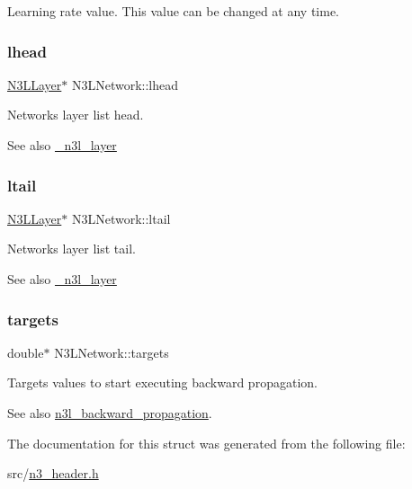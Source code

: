 Learning rate value. This value can be changed at any time. \mbox{\label{structN3LNetwork_ae77d4b7deecdc3c9590a4112689db2f8}} 
\subsubsection{\texorpdfstring{lhead}{lhead}}
{\footnotesize\ttfamily \hyperlink{n3__header_8h_a9ee3a7104816bdb6222148cfe9ca8ad9}{N3\+L\+Layer}$\ast$ N3\+L\+Network\+::lhead}

Network\textquotesingle{}s layer list head. \begin{DoxySeeAlso}{See also}
\hyperlink{struct__n3l__layer}{\+\_\+n3l\+\_\+layer} 
\end{DoxySeeAlso}
\mbox{\label{structN3LNetwork_a758fd06b3dda29e064ccd4bc4d27e1c3}} 
\subsubsection{\texorpdfstring{ltail}{ltail}}
{\footnotesize\ttfamily \hyperlink{n3__header_8h_a9ee3a7104816bdb6222148cfe9ca8ad9}{N3\+L\+Layer}$\ast$ N3\+L\+Network\+::ltail}

Network\textquotesingle{}s layer list tail. \begin{DoxySeeAlso}{See also}
\hyperlink{struct__n3l__layer}{\+\_\+n3l\+\_\+layer} 
\end{DoxySeeAlso}
\mbox{\label{structN3LNetwork_aba0f6767a66173743840b7c9fa919daf}} 
\subsubsection{\texorpdfstring{targets}{targets}}
{\footnotesize\ttfamily double$\ast$ N3\+L\+Network\+::targets}

Targets values to start executing backward propagation. \begin{DoxySeeAlso}{See also}
\hyperlink{n3__backward_8c_a871c936d33bfb280aa548e2dfd5ff32c}{n3l\+\_\+backward\+\_\+propagation}. 
\end{DoxySeeAlso}


The documentation for this struct was generated from the following file\+:\begin{DoxyCompactItemize}
\item 
src/\hyperlink{n3__header_8h}{n3\+\_\+header.\+h}\end{DoxyCompactItemize}
